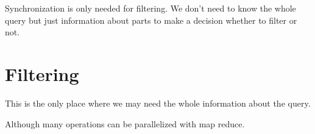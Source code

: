 Synchronization is only needed for filtering. We don't need to know the whole query but just information about parts to make a decision whether to filter or not.

\section{Filtering}

This is the only place where we may need the whole information about the query.

Although many operations can be parallelized with map reduce.


